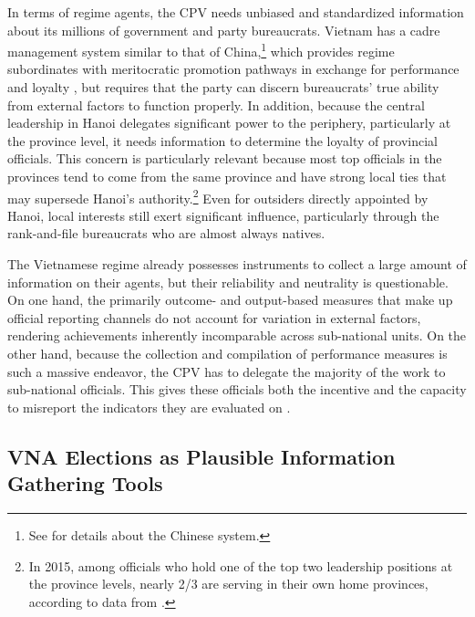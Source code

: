 \documentclass[12pt]{article}
\newcommand\fnote[1]{\footnote{\baselineskip=2\normalbaselineskip#1}}
\newcommand{\1}{\mathbbm{1}}
\begin{document}
In terms of regime agents, the CPV needs unbiased and standardized information about its millions of government and party bureaucrats. Vietnam has a cadre management system similar to that of China,\fnote{See \citet{Manion1985} for details about the Chinese system.} which provides regime subordinates with meritocratic promotion pathways in exchange for performance and loyalty \citep{Svolik2012}, but requires that the party can discern bureaucrats' true ability from external factors to function properly. In addition, because the central leadership in Hanoi delegates significant power to the periphery, particularly at the province level, it needs information to determine the loyalty of provincial officials. This concern is particularly relevant because most top officials in the provinces tend to come from the same province and have strong local ties that may supersede Hanoi's authority.\fnote{In 2015, among officials who hold one of the top two leadership positions at the province levels, nearly 2/3 are serving in their own home provinces, according to data from \citet{MaleskyPhan2017}.} Even for outsiders directly appointed by Hanoi, local interests still exert significant influence, particularly through the rank-and-file bureaucrats who are almost always natives. 

The Vietnamese regime already possesses instruments to collect a large amount of information on their agents, but their reliability and neutrality is questionable. On one hand, the primarily outcome- and output-based measures that make up official reporting channels do not account for variation in external factors, rendering achievements inherently incomparable across sub-national units. On the other hand, because the collection and compilation of performance measures is such a massive endeavor, the CPV has to delegate the majority of the work to sub-national officials. This gives these officials both the incentive and the capacity to misreport the indicators they are evaluated on \citep[][Ch. 8]{JensenMalesky2018}.

\subsection{VNA Elections as Plausible Information Gathering Tools}
\end{document}
